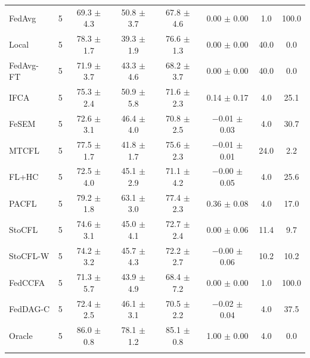 {{\begin{tabular}{l r c c c c c c}
FedAvg & 5 & 69.3 $\pm$ 4.3 & 50.8 $\pm$ 3.7 & 67.8 $\pm$ 4.6 & 0.00 $\pm$ 0.00 & 1.0 & 100.0 \\
Local & 5 & 78.3 $\pm$ 1.7 & 39.3 $\pm$ 1.9 & 76.6 $\pm$ 1.3 & 0.00 $\pm$ 0.00 & 40.0 & 0.0 \\
FedAvg-FT & 5 & 71.9 $\pm$ 3.7 & 43.3 $\pm$ 4.6 & 68.2 $\pm$ 3.7 & 0.00 $\pm$ 0.00 & 40.0 & 0.0 \\
IFCA & 5 & 75.3 $\pm$ 2.4 & 50.9 $\pm$ 5.8 & 71.6 $\pm$ 2.3 & 0.14 $\pm$ 0.17 & 4.0 & 25.1 \\
FeSEM & 5 & 72.6 $\pm$ 3.1 & 46.4 $\pm$ 4.0 & 70.8 $\pm$ 2.5 & $-$0.01 $\pm$ 0.03 & 4.0 & 30.7 \\
MTCFL & 5 & 77.5 $\pm$ 1.7 & 41.8 $\pm$ 1.7 & 75.6 $\pm$ 2.3 & $-$0.01 $\pm$ 0.01 & 24.0 & 2.2 \\
FL+HC & 5 & 72.5 $\pm$ 4.0 & 45.1 $\pm$ 2.9 & 71.1 $\pm$ 4.2 & $-$0.00 $\pm$ 0.05 & 4.0 & 25.6 \\
PACFL & 5 & 79.2 $\pm$ 1.8 & 63.1 $\pm$ 3.0 & 77.4 $\pm$ 2.3 & 0.36 $\pm$ 0.08 & 4.0 & 17.0 \\
StoCFL & 5 & 74.6 $\pm$ 3.1 & 45.0 $\pm$ 4.1 & 72.7 $\pm$ 2.4 & 0.00 $\pm$ 0.06 & 11.4 & 9.7 \\
StoCFL-W & 5 & 74.2 $\pm$ 3.2 & 45.7 $\pm$ 4.3 & 72.2 $\pm$ 2.7 & $-$0.00 $\pm$ 0.06 & 10.2 & 10.2 \\
FedCCFA & 5 & 71.3 $\pm$ 5.7 & 43.9 $\pm$ 4.9 & 68.4 $\pm$ 7.2 & 0.00 $\pm$ 0.00 & 1.0 & 100.0 \\
FedDAG-C & 5 & 72.4 $\pm$ 2.5 & 46.1 $\pm$ 3.1 & 70.5 $\pm$ 2.2 & $-$0.02 $\pm$ 0.04 & 4.0 & 37.5 \\
Oracle & 5 & 86.0 $\pm$ 0.8 & 78.1 $\pm$ 1.2 & 85.1 $\pm$ 0.8 & 1.00 $\pm$ 0.00 & 4.0 & 0.0 \\
\addlinespace
\bottomrule
\end{tabular}}
}

